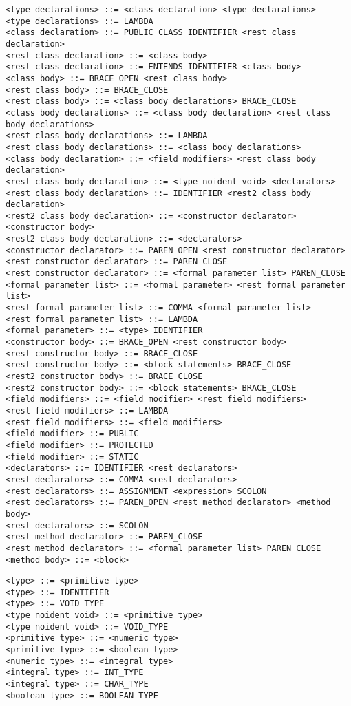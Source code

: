 \documentclass [a4paper,abstracton,titlepage]{scrartcl}
\begin{document}
\begin{lstlisting}<type declarations> ::= <class declaration> <type declarations>
<type declarations> ::= LAMBDA
<class declaration> ::= PUBLIC CLASS IDENTIFIER <rest class declaration>
<rest class declaration> ::= <class body>
<rest class declaration> ::= ENTENDS IDENTIFIER <class body>
<class body> ::= BRACE_OPEN <rest class body>
<rest class body> ::= BRACE_CLOSE
<rest class body> ::= <class body declarations> BRACE_CLOSE
<class body declarations> ::= <class body declaration> <rest class body declarations>
<rest class body declarations> ::= LAMBDA
<rest class body declarations> ::= <class body declarations>
<class body declaration> ::= <field modifiers> <rest class body declaration>
<rest class body declaration> ::= <type noident void> <declarators>
<rest class body declaration> ::= IDENTIFIER <rest2 class body declaration>
<rest2 class body declaration> ::= <constructor declarator> <constructor body>
<rest2 class body declaration> ::= <declarators>
<constructor declarator> ::= PAREN_OPEN <rest constructor declarator>
<rest constructor declarator> ::= PAREN_CLOSE
<rest constructor declarator> ::= <formal parameter list> PAREN_CLOSE
<formal parameter list> ::= <formal parameter> <rest formal parameter list>
<rest formal parameter list> ::= COMMA <formal parameter list>
<rest formal parameter list> ::= LAMBDA
<formal parameter> ::= <type> IDENTIFIER
<constructor body> ::= BRACE_OPEN <rest constructor body>
<rest constructor body> ::= BRACE_CLOSE
<rest constructor body> ::= <block statements> BRACE_CLOSE
<rest2 constructor body> ::= BRACE_CLOSE
<rest2 constructor body> ::= <block statements> BRACE_CLOSE
<field modifiers> ::= <field modifier> <rest field modifiers>
<rest field modifiers> ::= LAMBDA
<rest field modifiers> ::= <field modifiers>
<field modifier> ::= PUBLIC
<field modifier> ::= PROTECTED
<field modifier> ::= STATIC
<declarators> ::= IDENTIFIER <rest declarators>
<rest declarators> ::= COMMA <rest declarators>
<rest declarators> ::= ASSIGNMENT <expression> SCOLON
<rest declarators> ::= PAREN_OPEN <rest method declarator> <method body>
<rest declarators> ::= SCOLON
<rest method declarator> ::= PAREN_CLOSE
<rest method declarator> ::= <formal parameter list> PAREN_CLOSE
<method body> ::= <block>\end{lstlisting}

\begin{lstlisting}<type> ::= <primitive type>
<type> ::= IDENTIFIER
<type> ::= VOID_TYPE
<type noident void> ::= <primitive type>
<type noident void> ::= VOID_TYPE
<primitive type> ::= <numeric type>
<primitive type> ::= <boolean type>
<numeric type> ::= <integral type>
<integral type> ::= INT_TYPE
<integral type> ::= CHAR_TYPE
<boolean type> ::= BOOLEAN_TYPE
\end{lstlisting}
\end{document}
